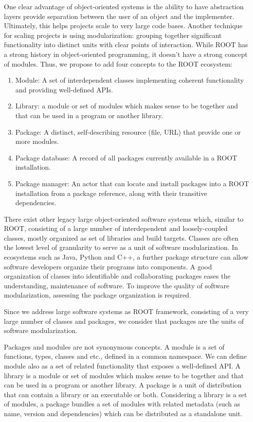 \documentclass{webofc}
\begin{document}
One clear advantage of object-oriented systems is the ability to have abstraction layers provide separation between the user of an object and the implementer.  Ultimately, this helps projects scale to very large code bases.  Another technique for scaling projects is using modularization: grouping together significant functionality into distinct units with clear points of interaction.  While ROOT has a strong history in object-oriented programming, it doesn’t have a strong concept of modules.  Thus, we propose to add four concepts to the ROOT ecosystem:
\begin{enumerate}
\item Module: A set of interdependent classes implementing coherent functionality and providing well-defined APIs.
\item Library: a module or set of modules  which makes sense to be together and that can be used in a program or another library.
\item Package: A distinct, self-describing resource (file, URL) that provide one or more modules.
\item Package database: A record of all packages currently available in a ROOT installation.
\item Package manager: An actor that can locate and install packages into a ROOT installation from a package reference, along with their transitive dependencies.
\end{enumerate}
There exist other legacy large object-oriented software systems  which, similar to ROOT, consisting of a large number of interdependent  and loosely-coupled classes, mostly organized as set of libraries and build targets.  Classes are often the lowest level of granularity to serve as a unit of software modularization. In ecosystems such as Java,  Python and C++, a further package structure can allow software developers organize their programs into components. A good organization of classes into identifiable and collaborating packages eases the understanding, maintenance of software. To improve the quality of software modularization, assessing the package organization is required.

Since we address large software systems as ROOT framework, consisting of a very large number of classes and packages, we consider that packages are the units of software modularization. 

Packages and modules are not synonymous concepts.  A module is a set of functions, types, classes and etc., defined in a common namespace. We can define module also as a set of related functionality that exposes a well-defined API. A library is a module or set of modules  which makes sense to be together and that can be used in a program or another library. A package is a unit of distribution that can contain a library or an executable or both. Considering a library is a set of modules, a package bundles a set of modules with related metadata (such as name, version and dependencies) which can be distributed as a standalone unit.
\end{document}
